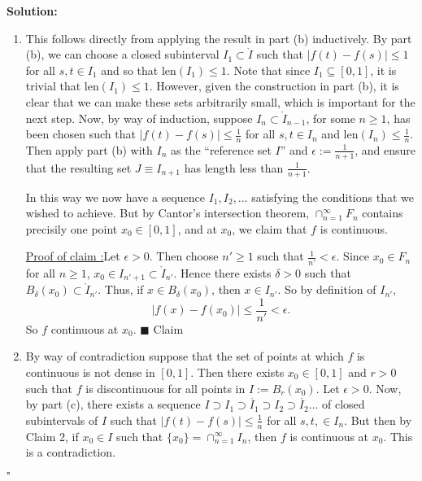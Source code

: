 \documentclass[12pt]{article}
\newcounter{ProofCounter}
\newcounter{ClaimCounter}[ProofCounter]
\newenvironment{Solution}{\stepcounter{ProofCounter}\textbf{Solution:}}{\hfill$\square$}
\newenvironment{claim}[1]{\vspace{1mm}\stepcounter{ClaimCounter}\par\noindent\underline{\bf Claim \theClaimCounter:}\space#1}{}
\newenvironment{claimproof}[1]{\par\noindent\underline{Proof of claim \theClaimCounter:}\space#1}{\hfill $\blacksquare$ Claim \theClaimCounter}
\begin{document}
\begin{Solution}
\begin{enumerate}
\begin{enumerate}
        \item This follows directly from applying the result in part (b) inductively. By part (b), we can choose a closed subinterval $I_1 \subset
          \mathring{I}$ such that
          $|f(t) - f(s)| \leq 1$ for all $s, t \in I_1$ and so that $\text{len}(I_1) \leq 1$. Note that since $I_1 \subseteq [0,1]$, it is trivial
          that $\text{len}(I_1) \leq 1$. However, given the construction in part (b), it is clear that we can make these sets arbitrarily small, which
          is important for the next step. Now, by way of induction, suppose $I_n \subset \mathring{I}_{n-1}$, for some $n\geq 1$, has been chosen such that $|f(t) - f(s)| \leq
          \frac{1}{n}$ for all $s,t \in I_n$ and $\text{len}(I_n) \leq \frac{1}{n}$. Then apply part (b) with $I_n$ as the ``reference set $I$'' and $\epsilon :=
          \frac{1}{n+1}$, and ensure that the resulting set $J \equiv I_{n+1}$ has length less than $\frac{1}{n+1}$.

          In this way we now have a sequence $I_1, I_2, \dots$ satisfying the conditions that we wished to achieve. But by Cantor's intersection
          theorem, $\cap_{n=1}^{\infty}F_{n}$ contains precisily one point $x_0 \in [0,1]$, and at $x_0$, we claim that $f$ is continuous.

          \begin{claimproof}
            Let $\epsilon > 0$. Then choose $n' \geq 1$ such that $\frac{1}{n'} < \epsilon$. Since $x_0 \in F_n$ for all $n \geq 1$,
            $x_0 \in I_{n'+1} \subset \mathring{I}_{n'}$. Hence there exists $\delta > 0$ such that $B_{\delta}(x_0) \subset \mathring{I}_{n'}$.
            Thus, if $x \in B_{\delta}(x_0)$, then $x \in I_{n'}$. So by definition of $I_{n'}$,
            \[
              |f(x) - f(x_0)| \leq \frac{1}{n'} < \epsilon.
            \]
            So $f$ continuous at $x_0$.
          \end{claimproof}

        \item By way of contradiction suppose that the set of points at which $f$ is continuous is not dense in $[0,1]$. Then there exists $x_0 \in
          [0,1]$ and $r > 0$ such that $f$ is discontinuous for all points in $I := B_{r}(x_0)$. Let $\epsilon > 0$. Now, by part (c), there exists a
          sequence $I\supset I_1 \supset \mathring{I_1} \supset I_2 \supset \mathring{I_2} \dots$ of closed subintervals of $I$ such that $|f(t) -
          f(s)| \leq \frac{1}{n}$ for all $s, t, \in I_n$. But then by Claim 2, if $x_0 \in I$ such that $\{x_0\} = \cap_{n=1}^{\infty}I_n$, then $f$
          is continuous at $x_0$. This is a contradiction.

      \end{enumerate}
  \end{enumerate}
\end{Solution}
\end{document}

